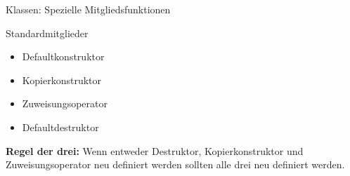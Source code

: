 \ifnum\conditionmacro=1 \documentclass[handout,usenames,dvipsnames]{beamer}\fi
\begin{document}
\begin{frame}{Klassen: Spezielle Mitgliedsfunktionen}
\begin{block}{Standardmitglieder}
\begin{itemize}
\item Defaultkonstruktor
\item Kopierkonstruktor
\item Zuweisungsoperator
\item Defaultdestruktor
\end{itemize}

\end{block}

\textbf{Regel der drei:} Wenn entweder Destruktor, Kopierkonstruktor und Zuweisungsoperator neu definiert werden sollten alle drei neu definiert werden.
\end{frame}
\end{document}
